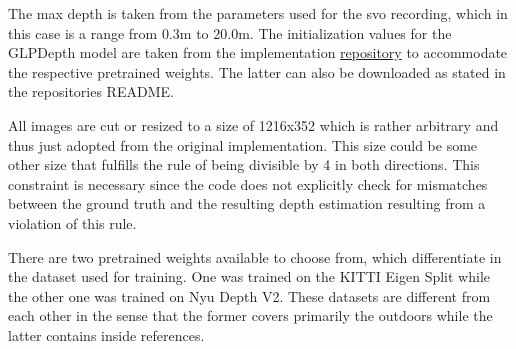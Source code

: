 The max depth is taken from the parameters used for the svo recording, which in this case is a range from $0.3\mathrm{m}$ to $20.0\mathrm{m}$. The initialization values for the GLPDepth model are taken from the implementation \href{https://github.com/vinvino02/GLPDepth}{repository} to accommodate the respective pretrained weights. The latter can also be downloaded as stated in the repositories README.

All images are cut or resized to a size of 1216x352 which is rather arbitrary and thus just adopted from the original implementation. This size could be some other size that fulfills the rule of being divisible by 4 in both directions. This constraint is necessary since the code does not explicitly check for mismatches between the ground truth and the resulting depth estimation resulting from a violation of this rule.

There are two pretrained weights available to choose from, which differentiate in the dataset used for training. One was trained on the KITTI Eigen Split while the other one was trained on Nyu Depth V2. These datasets are different from each other in the sense that the former covers primarily the outdoors while the latter contains inside references.
